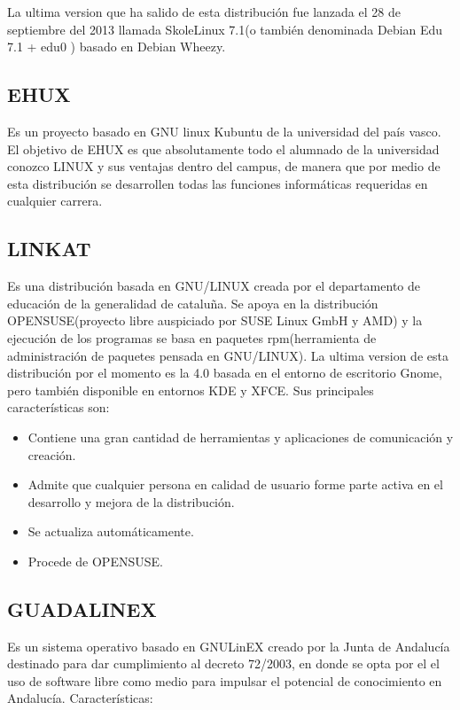 La ultima version que ha salido de esta distribución fue lanzada
el 28 de septiembre del 2013 llamada SkoleLinux 7.1(o también
denominada Debian Edu 7.1 + edu0 ) basado en Debian Wheezy.

\subsection*{EHUX}
Es un proyecto basado en GNU linux Kubuntu de la
universidad del país vasco.
El objetivo de EHUX es que absolutamente todo el alumnado de
la universidad conozco LINUX y sus ventajas dentro del campus,
de manera que por medio de esta distribución se desarrollen
todas las funciones informáticas requeridas en cualquier
carrera.

\subsection*{LINKAT}
Es una distribución basada en GNU/LINUX creada por el
departamento de educación de la generalidad de cataluña. Se
apoya en la distribución OPENSUSE(proyecto libre auspiciado
por SUSE Linux GmbH y AMD) y la ejecución de los programas
se basa en paquetes rpm(herramienta de administración de
paquetes pensada en GNU/LINUX).
La ultima version de esta distribución por el momento es la 4.0
basada en el entorno de escritorio Gnome, pero también
disponible en entornos KDE y XFCE.
Sus principales características son:

\begin{itemize}
  \item Contiene una gran cantidad de herramientas y aplicaciones de comunicación y creación.
  \item Admite que cualquier persona en calidad de usuario forme parte activa en el desarrollo y mejora de la distribución.
  \item Se actualiza automáticamente.
  \item Procede de OPENSUSE.
\end{itemize}

\subsection*{GUADALINEX}
Es un sistema operativo basado en GNULinEX
creado por la Junta de Andalucía destinado para dar
cumplimiento al decreto 72/2003, en donde se opta por el el uso
de software libre como medio para impulsar el potencial de
conocimiento en Andalucía.
Características:

